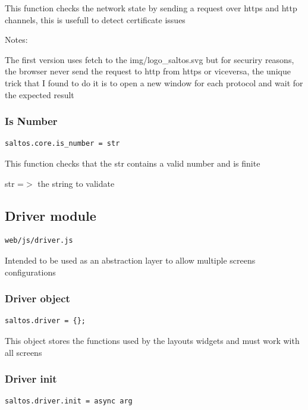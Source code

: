 \documentclass[a4paper]{article}
\begin{document}
This function checks the network state by sending a request over https and http
channels, this is usefull to detect certificate issues

Notes:

The first version uses fetch to the img/logo\_saltos.svg but for securiry reasons,
the browser never send the request to http from https or viceversa, the unique trick
that I found to do it is to open a new window for each protocol and wait for the
expected result

\hypertarget{toc164}{}
\subsubsection{Is Number}

\begin{lstlisting}
saltos.core.is_number = str
\end{lstlisting}

This function checks that the str contains a valid number and is finite

str =$>$ the string to validate

\hypertarget{toc165}{}
\subsection{Driver module}

\begin{lstlisting}
web/js/driver.js
\end{lstlisting}

Intended to be used as an abstraction layer to allow multiple screens configurations

\hypertarget{toc166}{}
\subsubsection{Driver object}

\begin{lstlisting}
saltos.driver = {};
\end{lstlisting}

This object stores the functions used by the layouts widgets and must work with all screens

\hypertarget{toc167}{}
\subsubsection{Driver init}

\begin{lstlisting}
saltos.driver.init = async arg
\end{lstlisting}
\end{document}
